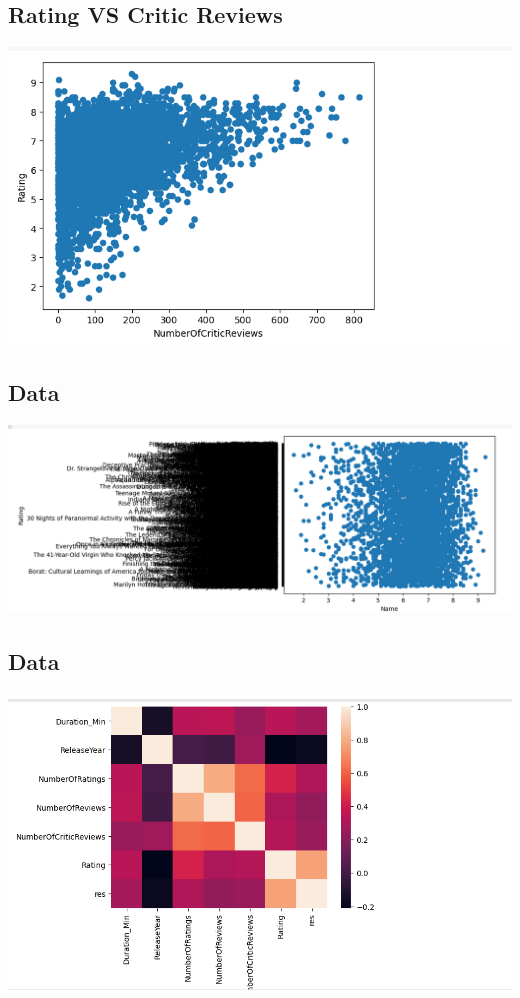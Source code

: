 \documentclass{article}
\begin{document}
\subsection{Rating VS Critic Reviews}
\begin{figure}
\end{figure}
\begin{center}
\includegraphics[scale=0.5]{Graph2}
\label{figure}
\end{center}
\subsection{Data}
\begin{figure}
\end{figure}
\begin{center}
\includegraphics[scale=0.5]{Names Attribute}
\label{figure}
\end{center}
\subsection{Data}
\begin{figure}
\end{figure}
\begin{center}
\includegraphics[scale=0.5]{Data1}
\label{figure}
\end{center}
\end{document}
